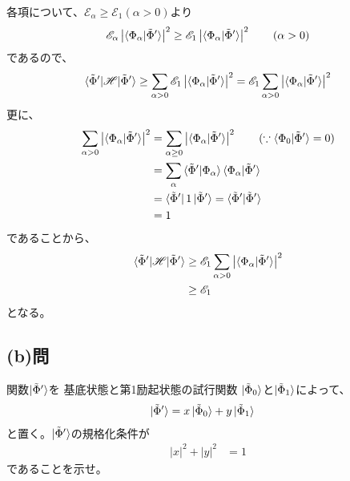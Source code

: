 各項について、$\mathscr{E}_{\alpha}\geq\mathscr{E}_{1}(\alpha>0)$より
\begin{align}
	\mathscr{E}_{\alpha}
		\left|\braket{\Phi_{\alpha}|\tilde{\Phi}'}\right|^2
\geq
	\mathscr{E}_{1}
		\left|\braket{\Phi_{\alpha}|\tilde{\Phi}'}\right|^2
	\qquad
	(\alpha>0)
\end{align}
であるので、
\begin{align}
	\braket{\tilde{\Phi}'|\mathscr{H}|\tilde{\Phi}'}
\geq
	\sum_{\alpha>0}
		\mathscr{E}_{1}
			\left|
				\braket{\Phi_{\alpha}|\tilde{\Phi}'}
			\right|^2
=
	\mathscr{E}_{1}
		\sum_{\alpha>0}
			\left|
				\braket{\Phi_{\alpha}|\tilde{\Phi}'}
			\right|^2
\end{align}
更に、
\begin{align}
	\sum_{\alpha>0}
		\left|
			\braket{\Phi_{\alpha}|\tilde{\Phi}'}
		\right|^2
&=
	\sum_{\alpha\geq 0}
		\left|
			\braket{\Phi_{\alpha}|\tilde{\Phi}'}
		\right|^2
	\qquad
	(\because\braket{\Phi_{0}|\tilde{\Phi}'}=0) \\
%
%
&=
	\sum_{\alpha}
		\braket{\tilde{\Phi}'|\Phi_{\alpha}}
			\braket{\Phi_{\alpha}|\tilde{\Phi}'} \\
%
%
&=
	\bra{\tilde{\Phi}'} 1 \ket{\tilde{\Phi}'}
=
	\braket{\tilde{\Phi}'|\tilde{\Phi}'} \\
%
%
&=
	1
\end{align}
であることから、
\begin{align}
	\braket{\tilde{\Phi}'|\mathscr{H}|\tilde{\Phi}'}
&\geq
	\mathscr{E}_1
		\sum_{\alpha>0}
			\left|
				\braket{\Phi_{\alpha}|\tilde{\Phi}'}
			\right|^2 \\
%
%
&\geq
	\mathscr{E}_1
\end{align}
となる。


\subsection{(b)問}
関数$\ket{\tilde{\Phi}'}$を
基底状態と第1励起状態の試行関数
$\ket{\tilde{\Phi}_0}$と$\ket{\tilde{\Phi}_1}$によって、
\begin{align}
	\ket{\tilde{\Phi}'}
&=
	x \ket{\tilde{\Phi}_0}
	+
	y \ket{\tilde{\Phi}_1}
\end{align}
と置く。$\ket{\tilde{\Phi}'}$の規格化条件が
\begin{align}
	|x|^2
	+
	|y|^2
&=
	1
\end{align}
であることを示せ。

